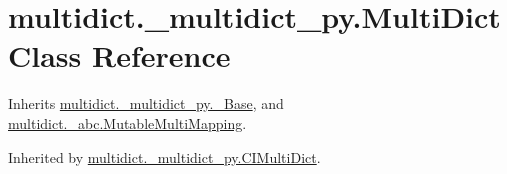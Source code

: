 \hypertarget{classmultidict_1_1__multidict__py_1_1_multi_dict}{}\section{multidict.\+\_\+multidict\+\_\+py.\+Multi\+Dict Class Reference}
\label{classmultidict_1_1__multidict__py_1_1_multi_dict}


Inherits \hyperlink{classmultidict_1_1__multidict__py_1_1___base}{multidict.\+\_\+multidict\+\_\+py.\+\_\+\+Base}, and \hyperlink{classmultidict_1_1__abc_1_1_mutable_multi_mapping}{multidict.\+\_\+abc.\+Mutable\+Multi\+Mapping}.



Inherited by \hyperlink{classmultidict_1_1__multidict__py_1_1_c_i_multi_dict}{multidict.\+\_\+multidict\+\_\+py.\+C\+I\+Multi\+Dict}.

